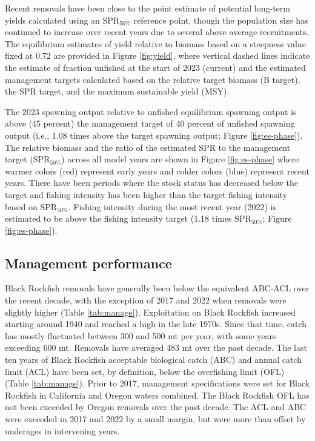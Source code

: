 \documentclass[11pt,
  letterpaper,
]{article}
\begin{document}
Recent removals have been close to the point estimate of potential long-term yields calculated using an \(\text{SPR}_{50\%}\) reference point, though the population size has continued to increase over recent years due to several above average recruitments. The equilibrium estimates of yield relative to biomass based on a steepness value fixed at 0.72 are provided in Figure \ref{fig:yield}, where vertical dashed lines indicate the estimate of fraction unfished at the start of 2023 (current) and the estimated management targets calculated based on the relative target biomass (B target), the SPR target, and the maximum sustainable yield (MSY).

The 2023 spawning output relative to unfished equilibrium spawning output is above (45 percent) the management target of 40 percent of unfished spawning output (i.e., 1.08 times above the target spawning output; Figure \ref{fig:es-phase}). The relative biomass and the ratio of the estimated SPR to the management target (\(\text{SPR}_{50\%}\)) across all model years are shown in Figure \ref{fig:es-phase} where warmer colors (red) represent early years and colder colors (blue) represent recent years. There have been periods where the stock status has decreased below the target and fishing intensity has been higher than the target fishing intensity based on \(\text{SPR}_{50\%}\). Fishing intensity during the most recent year (2022) is estimated to be above the fishing intensity target (1.18 times \(\text{SPR}_{50\%}\); Figure \ref{fig:es-phase}).

\hypertarget{management-performance-1}{%
\subsection{Management performance}\label{management-performance-1}}

Black Rockfish removals have generally been below the equivalent ABC-ACL over the recent decade, with the exception of 2017 and 2022 when removals were slightly higher (Table \ref{tab:manage}). Exploitation on Black Rockfish increased starting around 1940 and reached a high in the late 1970s. Since that time, catch has mostly fluctuated between 300 and 500 mt per year, with some years exceeding 600 mt. Removals have averaged 483 mt over the past decade. The last ten years of Black Rockfish acceptable biological catch (ABC) and annual catch limit (ACL) have been set, by definition, below the overfishing limit (OFL) (Table \ref{tab:manage}). Prior to 2017, management specifications were set for Black Rockfish in California and Oregon waters combined. The Black Rockfish OFL has not been exceeded by Oregon removals over the past decade. The ACL and ABC were exceeded in 2017 and 2022 by a small margin, but were more than offset by underages in intervening years.
\end{document}
